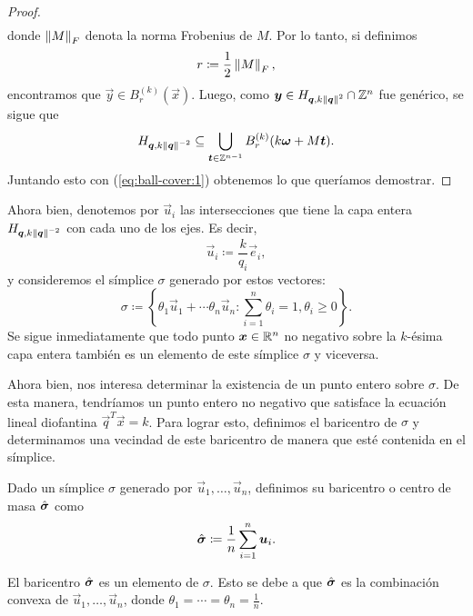 \begin{proof}
\begin{align}
	\end{align}
	donde $\left\lVert M \right\rVert_F$ denota la norma Frobenius de $M$. Por lo tanto, si definimos
	\begin{equation}
		\label{eq:radius}
		r \coloneq \frac{1}{2}\left\lVert M \right\rVert_F,
	\end{equation}
	encontramos que $\vec{y} \in B_r^{(k)}(\vec{x})$. Luego, como $\boldsymbol{y} \in H_{\boldsymbol{q},
	k\left\lVert \boldsymbol{q} \right\rVert^2} \cap \mathbb{Z}^n$ fue genérico, se sigue que
	\begin{equation}
		\label{eq:ball-cover:2}
		H_{\boldsymbol{q}, k\left\lVert \boldsymbol{q} \right\rVert^{-2}} \subseteq
		\bigcup_{\boldsymbol{t} \in \mathbb{Z}^{n-1}}B_r^{(k)}(k\boldsymbol{\omega} + M\boldsymbol{t}).
	\end{equation}
	Juntando esto con (\ref{eq:ball-cover:1}) obtenemos lo que queríamos demostrar.
\end{proof}

Ahora bien, denotemos por $\vec{u}_i$ las intersecciones que tiene la capa entera $H_{\boldsymbol{q},
k\left\lVert \boldsymbol{q} \right\rVert^{-2}}$ con cada uno de los ejes. Es decir,
\begin{equation}
	\label{eq:generators}
	\vec{u}_i \coloneq \frac{k}{q_i}\vec{e}_i,
\end{equation}
y consideremos el símplice $\sigma$ generado por estos vectores:
\begin{equation*}
	\sigma \coloneq \left\lbrace \theta_1\vec{u}_1 + \cdots \theta_n\vec{u}_n \colon
		\sum_{i=1}^{n}\theta_i = 1, \theta_i \geq 0 \right\rbrace.
\end{equation*}
Se sigue inmediatamente que todo punto $\boldsymbol{x} \in \mathbb{R}^n$ no negativo sobre la $k$-ésima capa entera
también es un elemento de este símplice $\sigma$ y viceversa.

Ahora bien, nos interesa determinar la existencia de un punto entero sobre $\sigma$. De esta manera,
tendríamos un punto entero no negativo que satisface la ecuación lineal diofantina
$\vec{q}^T\vec{x} = k$. Para lograr esto, definimos el baricentro de $\sigma$ y determinamos una
vecindad de este baricentro de manera que esté contenida en el símplice.

\begin{definition}
	Dado un símplice $\sigma$ generado por $\vec{u}_1, \ldots, \vec{u}_n$, definimos su baricentro o
	centro de masa $\hat{\boldsymbol{ \sigma }}$ como
	\begin{equation*}
		\hat{\boldsymbol{ \sigma }} \coloneq \frac{1}{n} \sum_{i=1}^{n}\boldsymbol{u}_i.
	\end{equation*}
\end{definition}
\begin{observation}
	El baricentro $\hat{\boldsymbol{ \sigma }}$ es un elemento de $\sigma$. Esto se debe a que $\hat{\boldsymbol{ \sigma }}$ es la
	combinación convexa de $\vec{u}_1, \ldots, \vec{u}_n$, donde $\theta_1 = \cdots = \theta_n =
	\frac{1}{n}$.
\end{observation}

